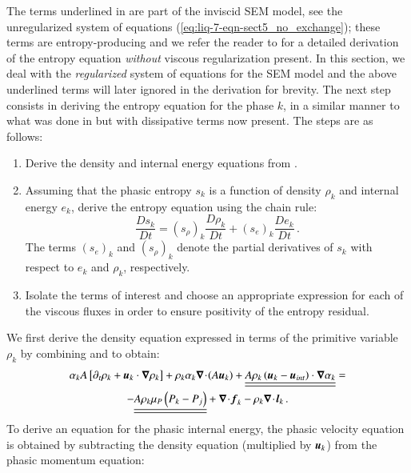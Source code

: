 \documentclass[preprint,10pt]{elsarticle}
\begin{document}
%
The terms underlined in  are part of the inviscid SEM model, see the unregularized system of equations (\eqref{eq:liq-7-eqn-sect5_no_exchange}); these terms are entropy-producing and we refer the reader to  for a detailed derivation of the 
entropy equation \emph{without} viscous regularization present. 
In this section, we deal with the \emph{regularized} system of equations for the SEM model and 
the above underlined terms will later ignored in the derivation for brevity. 
%
The next step consists in deriving the entropy equation for the phase $k$, in a similar manner to what was done in  but 
with dissipative terms now present. The steps are as follows:
%
\begin{enumerate}
\item Derive the density and internal energy equations from .
\item Assuming that the phasic entropy $s_k$ is a function of density $\rho_k$ and internal energy $e_k$, derive the entropy equation using the chain rule:
\begin{equation}
\label{eq:chain_rule-sct4}
\frac{Ds_k}{Dt} = \left( s_{\rho} \right)_k \frac{D \rho_k}{Dt} + \left( s_{e} \right)_k \frac{D e_k}{Dt} \,.
\end{equation}
The terms $(s_e)_k$ and $(s_{\rho})_k$ denote the partial derivatives of $s_k$ with respect to $e_k$ and $\rho_k$, respectively.
\item Isolate the terms of interest and choose an appropriate expression for each of the viscous fluxes in order to ensure positivity of the entropy residual.
\end{enumerate}
%
We first derive the density equation expressed in terms of the primitive variable $\rho_k$ by combining  and  to obtain:
%
\begin{multline}\label{eq:rho-7-eqn-model-sect4}
\alpha_k A \left[ \partial_t \rho_k + \boldsymbol u_k  \cdot \boldsymbol\nabla \rho_k \right] 
+ \rho_k \alpha_k \boldsymbol\nabla\! \cdot \! (A \boldsymbol u_k ) 
+  \underline{\underline{ A \rho_k \left( \boldsymbol u_k - \boldsymbol u_{int} \right) \cdot \boldsymbol\nabla \alpha_k}} = \\-\underline{\underline{A \rho_k \mu_P \left( P_k - P_j \right)}} + \boldsymbol\nabla\! \cdot \! \boldsymbol f_k - \rho_k \boldsymbol\nabla\! \cdot \! \boldsymbol l_k \,.
\end{multline}
%
To derive an equation for the phasic internal energy, the phasic velocity equation is obtained by subtracting the density equation (multiplied by $\boldsymbol u_k$) from the phasic momentum equation:
\end{document}
